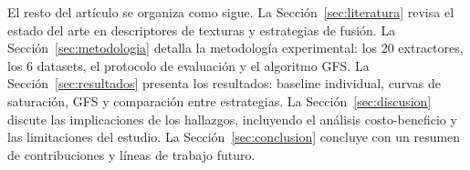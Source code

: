 \documentclass[a4paper,fleqn]{cas-sc}
\begin{document}
El resto del art\'iculo se organiza como sigue. La Secci\'on~\ref{sec:literatura} revisa el estado del arte en descriptores de texturas y estrategias de fusi\'on. La Secci\'on~\ref{sec:metodologia} detalla la metodolog\'ia experimental: los 20 extractores, los 6 datasets, el protocolo de evaluaci\'on y el algoritmo GFS. La Secci\'on~\ref{sec:resultados} presenta los resultados: baseline individual, curvas de saturaci\'on, GFS y comparaci\'on entre estrategias. La Secci\'on~\ref{sec:discusion} discute las implicaciones de los hallazgos, incluyendo el an\'alisis costo-beneficio y las limitaciones del estudio. La Secci\'on~\ref{sec:conclusion} concluye con un resumen de contribuciones y l\'ineas de trabajo futuro.


% 
% 
% 
% 


\printcredits



\end{document}
